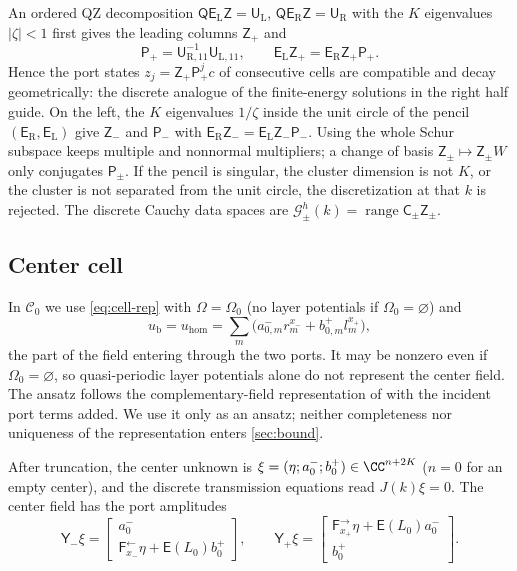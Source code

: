 An ordered QZ decomposition $\mathsf Q\mathsf E_{\mathrm L}\mathsf Z=\mathsf U_{\mathrm L}$,
$\mathsf Q\mathsf E_{\mathrm R}\mathsf Z=\mathsf U_{\mathrm R}$ with the $K$
eigenvalues $|\zeta|<1$ first gives the leading columns $\mathsf Z_+$ and
\begin{equation}\label{eq:propagation}
  \mathsf P_+=\mathsf U_{\mathrm R,11}^{-1}\mathsf U_{\mathrm L,11},\qquad
  \mathsf E_{\mathrm L}\mathsf Z_+=\mathsf E_{\mathrm R}\mathsf Z_+\mathsf P_+ .
\end{equation}
Hence the port states $z_j=\mathsf Z_+\mathsf P_+^jc$ of consecutive cells are
compatible and decay geometrically: the discrete analogue of the
finite-energy solutions in the right half guide. On the left, the $K$ eigenvalues $1/\zeta$ inside the unit circle of the pencil
$(\mathsf E_{\mathrm R},\mathsf E_{\mathrm L})$ give $\mathsf Z_-$ and $\mathsf P_-$ with
$\mathsf E_{\mathrm R}\mathsf Z_-=\mathsf E_{\mathrm L}\mathsf Z_-\mathsf P_-$.
Using the whole Schur subspace keeps multiple and nonnormal multipliers; a
change of basis $\mathsf Z_\pm\mapsto\mathsf Z_\pm W$ only conjugates
$\mathsf P_\pm$. If the pencil is singular, the cluster dimension is not $K$,
or the cluster is not separated from the unit circle, the discretization at
that $k$ is rejected. The discrete Cauchy data spaces are
$\mathcal G^h_\pm(k)=\operatorname{range}\mathsf C_\pm\mathsf Z_\pm$.

\subsection{Center cell}\label{sec:center}
In $\mathcal C_0$ we use \eqref{eq:cell-rep} with $\Omega=\Omega_0$ (no layer
potentials if $\Omega_0=\varnothing$) and
\[
  u_{\mathrm b}=u_{\mathrm{hom}}=\sum_m\bigl(a^-_{0,m}r_m^{x_-}+b^+_{0,m}l_m^{x_+}\bigr),
\]
the part of the field entering through the two ports. It may be nonzero even
if $\Omega_0=\varnothing$, so quasi-periodic layer potentials alone do not
represent the center field. The ansatz follows the complementary-field
representation of \cite[App.~A]{BarnettGreengard2010} with the incident port
terms added. We use it only as an ansatz; neither completeness nor uniqueness of
the representation enters \cref{sec:bound}.

After truncation, the center unknown is $\xi=(\eta;a^-_0;b^+_0)\in\CC^{n+2K}$
($n=0$ for an empty center), and the discrete transmission equations read
$J(k)\xi=0$. The center field has the port amplitudes
\[
  \mathsf Y_-\xi=\begin{bmatrix}a^-_0\\ \mathsf F^{\leftarrow}_{x_-}\eta+\mathsf E(L_0)b^+_0\end{bmatrix},
  \qquad
  \mathsf Y_+\xi=\begin{bmatrix}\mathsf F^{\rightarrow}_{x_+}\eta+\mathsf E(L_0)a^-_0\\ b^+_0\end{bmatrix}.
\]

